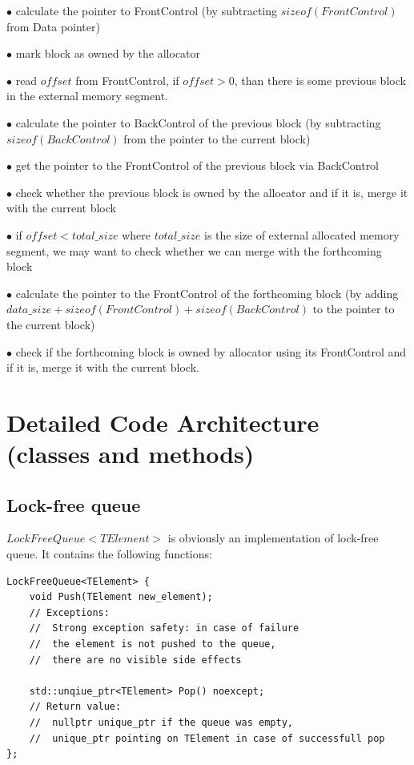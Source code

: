 \documentclass{article}
\begin{document}
$\bullet$ calculate the pointer to FrontControl (by subtracting $sizeof(FrontControl)$ from Data pointer)

$\bullet$ mark block as owned by the allocator

$\bullet$ read $offset$ from FrontControl, if $offset > 0$, than there is some previous block in the external memory segment.

$\bullet$ calculate the pointer to BackControl of the previous block (by subtracting $sizeof(BackControl)$ from the pointer to the current block)

$\bullet$ get the pointer to the FrontControl of the previous block via BackControl

$\bullet$ check whether the previous block is owned by the allocator and if it is, merge it with the current block

$\bullet$ if $offset < total\_size$ where $total\_size$ is the size of external allocated memory segment, we may want to check whether we can merge with the forthcoming block

$\bullet$ calculate the pointer to the FrontControl of the forthcoming block (by adding $data\_size + sizeof(FrontControl) + sizeof(BackControl)$ to the pointer to the current block)

$\bullet$ check if the forthcoming block is owned by allocator using its FrontControl and if it is, merge it with the current block.

\newpage

\section{Detailed Code Architecture (classes and methods)}

\subsection{Lock-free queue}

$LockFreeQueue<TElement>$ is obviously an implementation of lock-free queue. It contains the following functions:


\begin{lstlisting}
LockFreeQueue<TElement> {
	void Push(TElement new_element);
	// Exceptions:
	// 	Strong exception safety: in case of failure
	// 	the element is not pushed to the queue,
	// 	there are no visible side effects

	std::unqiue_ptr<TElement> Pop() noexcept;
	// Return value:
	// 	nullptr unique_ptr if the queue was empty,
	// 	unique_ptr pointing on TElement in case of successfull pop
};
\end{lstlisting}
\end{document}
